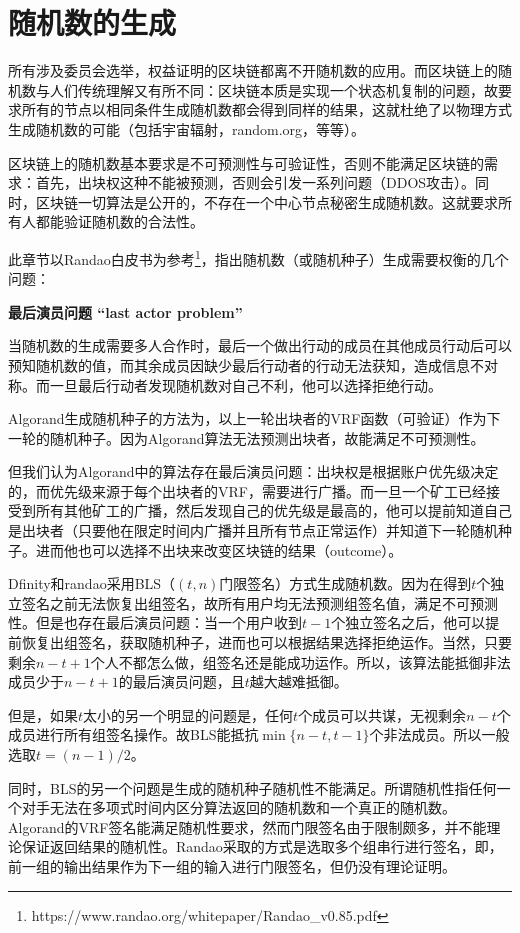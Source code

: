 \section{随机数的生成}
所有涉及委员会选举，权益证明的区块链都离不开随机数的应用。而区块链上的随机数与人们传统理解又有所不同：区块链本质是实现一个状态机复制的问题，故要求所有的节点以相同条件生成随机数都会得到同样的结果，这就杜绝了以物理方式生成随机数的可能（包括宇宙辐射，random.org，等等）。

区块链上的随机数基本要求是不可预测性与可验证性，否则不能满足区块链的需求：首先，出块权这种不能被预测，否则会引发一系列问题（DDOS攻击）。同时，区块链一切算法是公开的，不存在一个中心节点秘密生成随机数。这就要求所有人都能验证随机数的合法性。	

此章节以Randao白皮书为参考\footnote{https://www.randao.org/whitepaper/Randao\_v0.85.pdf}，指出随机数（或随机种子）生成需要权衡的几个问题：

\textbf{最后演员问题 “last actor problem”}

当随机数的生成需要多人合作时，最后一个做出行动的成员在其他成员行动后可以预知随机数的值，而其余成员因缺少最后行动者的行动无法获知，造成信息不对称。而一旦最后行动者发现随机数对自己不利，他可以选择拒绝行动。

Algorand生成随机种子的方法为，以上一轮出块者的VRF函数（可验证）作为下一轮的随机种子。因为Algorand算法无法预测出块者，故能满足不可预测性。

但我们认为Algorand中的算法存在最后演员问题：出块权是根据账户优先级决定的，而优先级来源于每个出块者的VRF，需要进行广播。而一旦一个矿工已经接受到所有其他矿工的广播，然后发现自己的优先级是最高的，他可以提前知道自己是出块者（只要他在限定时间内广播并且所有节点正常运作）并知道下一轮随机种子。进而他也可以选择不出块来改变区块链的结果（outcome）。

Dfinity和randao采用BLS（$(t,n)$门限签名）方式生成随机数。因为在得到$t$个独立签名之前无法恢复出组签名，故所有用户均无法预测组签名值，满足不可预测性。但是也存在最后演员问题：当一个用户收到$t-1$个独立签名之后，他可以提前恢复出组签名，获取随机种子，进而也可以根据结果选择拒绝运作。当然，只要剩余$n-t+1$个人不都怎么做，组签名还是能成功运作。所以，该算法能抵御非法成员少于$n-t+1$的最后演员问题，且$t$越大越难抵御。

但是，如果$t$太小的另一个明显的问题是，任何$t$个成员可以共谋，无视剩余$n-t$个成员进行所有组签名操作。故BLS能抵抗$\min\{ n-t,t-1\}$个非法成员。所以一般选取$t=(n-1)/2$。

同时，BLS的另一个问题是生成的随机种子随机性不能满足。所谓随机性指任何一个对手无法在多项式时间内区分算法返回的随机数和一个真正的随机数。Algorand的VRF签名能满足随机性要求，然而门限签名由于限制颇多，并不能理论保证返回结果的随机性。Randao采取的方式是选取多个组串行进行签名，即，前一组的输出结果作为下一组的输入进行门限签名，但仍没有理论证明。

	

